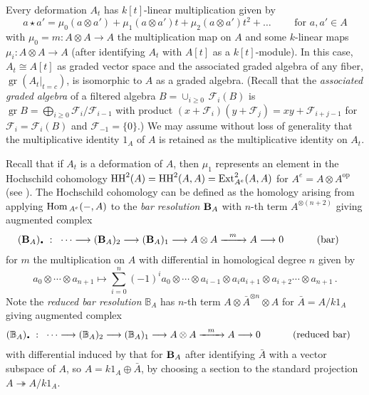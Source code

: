 \documentclass[11pt]{amsart}
\numberwithin{equation}{section}
\DeclareMathOperator{\Ext}{Ext}
\DeclareMathOperator{\gr}{gr}
\newcommand{\sA}{A }
\newcommand{\sd}{_{\DOT}}%
\newcommand{\B}{{\bf B}} %
\newcommand{\BB}{\mathbb{B}} %
\newcommand{\DOT}{\setlength{\unitlength}{1.2pt}\begin{picture}(2.5,2)
               (1,1)\put(2.5,2.5){\circle*{2}}\end{picture}}
\renewcommand{\_}[1]{\mbox{$_{\left( #1 \right)}$}}
\newcommand{\Hom}{\mbox{\rm Hom\,}}
\newcommand{\F}{\mathcal F}
\newcommand{\ot}{\otimes}
\newcommand{\HH}{{\rm HH}}
\begin{document}
Every deformation $\sA_t$ 
has $k[t]$-linear multiplication given by
$$
a\star a' = \mu_0(a\ot a') +
\mu_1(a\ot a')t + \mu_2(a\ot a')t^2 + \ldots 
\qquad\text{ for } a,a'\in \sA 
$$
with $\mu_0=m:\sA\ot \sA\rightarrow \sA$ the multiplication map on $\sA$
and some $k$-linear maps $\mu_i:\sA\ot \sA\rightarrow \sA$
(after identifying $\sA_t$ with $\sA[t]$ as a $k[t]$-module).
In this case,
$\sA_t\cong \sA[t]$
 as graded vector space
and the associated graded algebra of any fiber,
$\gr (\sA_t|_{t=c})$, is isomorphic to $\sA$ as a graded algebra.
(Recall that the 
{\em associated graded algebra}
of a filtered algebra $
B=\cup_{i\geq 0} \, \F_i(B)$
is
$ \gr B =\bigoplus_{i\geq 0} \F_i/ \F_{i-1}$
with 
product
$(x +\F_i)(y +\F_j)=xy  +
\F_{i+j-1}$ for
$\F_i=\F_i(B)$ and
$\F_{-1}=\{0\}$.)
We may assume without loss of generality that the multiplicative
identity $1_{\sA}$ of $\sA$ is retained as the multiplicative
identity on $\sA_t$.


Recall that if $\sA_t$ is a deformation of $\sA$,
then $\mu_1$ represents an element 
in the Hochschild cohomology
$\HH^2(\sA)=\HH^2(\sA,\sA)=\Ext^{2}_{\sA^e}(\sA,\sA)$
for $\sA^e=\sA\ot \sA^{\text{op}}$ (see \cite{GerstenhaberSchack}).
The Hochschild cohomology can be defined as the homology
arising from applying $\Hom_{\sA^e}(-, \sA)$
to the {\em bar resolution} $\B_{\sA}$ with $n$-th term
$\sA^{\ot (n+2)}$ giving augmented complex
$$
\begin{aligned}
  (\B_{\sA})\sd\ :\ \ 
  & \cdots \longrightarrow (\B_{\sA})_2 \longrightarrow (\B_{\sA})_1 \longrightarrow \sA\ot
  \sA
  \xrightarrow{\ \ m\ \ } 
\sA \longrightarrow 0 \qquad && \text{ (bar) }
\end{aligned}
$$
for $m$ the multiplication on $\sA$ with differential in homological
degree $n$ given by
\begin{equation}\label{eqn:bar-diff}
  a_0\ot\cdots \ot a_{n+1}
  \mapsto \sum_{i=0}^{n} (-1)^i  a_0\ot\cdots\ot a_{i-1}\ot a_ia_{i+1}\ot a_{i+2} \cdots
   \ot a_{n+1} \, .
\end{equation}
Note the {\em reduced bar resolution} $\BB_{\sA}$
has $n$-th term $\sA\ot \bar{\sA}^{\ot n} \ot \sA$
for $\bar \sA=\sA/k1_{\sA}$ giving augmented complex
$$
\begin{aligned}
  (\BB_{\sA})\sd\ :\ \ 
  & \cdots \longrightarrow (\BB_{\sA})_2 \longrightarrow (\BB_{\sA})_1 \longrightarrow \sA\ot
  \sA
  \xrightarrow{\ \ m\ \ } 
\sA \longrightarrow 0 \qquad && \text{ (reduced bar) }
\end{aligned}
$$
with differential induced by that for $\B_{\sA}$ after identifying
$\bar \sA$ with a vector subspace of $\sA$, so $\sA=k1_{\sA}\oplus \bar {\sA}$,
by choosing a section to the standard projection
$\sA\twoheadrightarrow \sA/k1_{\sA}$.
\end{document}
